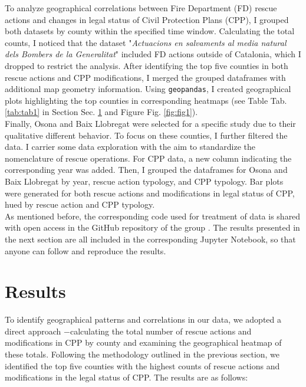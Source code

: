 \documentclass[
  journal=small,
  manuscript=mini-article,  %
  year=2023,
  volume=1,
]{odj-journal}
\begin{document}
To analyze geographical correlations between Fire Department (FD) rescue actions and changes in legal status of Civil Protection Plans (CPP), I grouped both datasets by county within the specified time window. Calculating the total counts, I noticed that the dataset "\textit{Actuacions en salvaments al media natural dels Bombers de la Generalitat}" included FD actions outside of Catalonia, which I dropped to restrict the analysis. After identifying the top five counties in both rescue actions and CPP modifications, I merged the grouped dataframes with additional map geometry information. Using \texttt{geopandas}, I created geographical plots highlighting the top counties in corresponding heatmaps (see Table Tab. \ref{tab:tab1} in Section Sec. \ref{sec:res} and Figure Fig. \ref{fig:fig1}).\\

Finally, Osona and Baix Llobregat were selected for a specific study due to their qualitative different behavior. To focus on these counties, I further filtered the data. I carrier some data exploration with the aim to standardize the nomenclature of rescue operations. For CPP data, a new column indicating the corresponding year was added. Then, I grouped the dataframes for Osona and Baix Llobregat by year, rescue action typology, and CPP typology. Bar plots were generated for both rescue actions and modifications in legal status of CPP, hued by rescue action and CPP typology.\\

As mentioned before, the corresponding code used for treatment of data is shared with open access in the GitHub repository of the group \cite{github_repo}. The results presented in the next section are all included in the corresponding Jupyter Notebook, so that anyone can follow and reproduce the results.

\section{Results}\label{sec:res}
To identify geographical patterns and correlations in our data, we adopted a direct approach $-$calculating the total number of rescue actions and modifications in CPP by county and examining the geographical heatmap of these totals. Following the methodology outlined in the previous section, we identified the top five counties with the highest counts of rescue actions and modifications in the legal status of CPP. The results are as follows:
\end{document}
